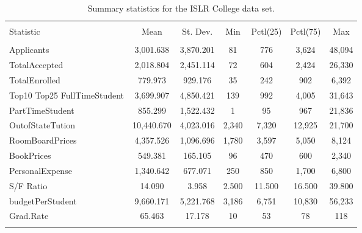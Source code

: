 \documentclass{article}\usepackage[]{graphicx}\usepackage[]{color}
\begin{document}
\begin{sidewaystable}[!htbp] \centering 
  \caption{Summary statistics for the ISLR College data set.} 
  \label{descrips} 
\begin{tabular}{@{\extracolsep{5pt}}lcccccc} 
\\[-1.8ex]\hline 
\hline \\[-1.8ex] 
Statistic & \multicolumn{1}{c}{Mean} & \multicolumn{1}{c}{St. Dev.} & \multicolumn{1}{c}{Min} & \multicolumn{1}{c}{Pctl(25)} & \multicolumn{1}{c}{Pctl(75)} & \multicolumn{1}{c}{Max} \\ 
\hline \\[-1.8ex] 
Applicants & 3,001.638 & 3,870.201 & 81 & 776 & 3,624 & 48,094 \\ 
TotalAccepted & 2,018.804 & 2,451.114 & 72 & 604 & 2,424 & 26,330 \\ 
TotalEnrolled & 779.973 & 929.176 & 35 & 242 & 902 & 6,392 \\ 
Top10%
Top25%
FullTimeStudent & 3,699.907 & 4,850.421 & 139 & 992 & 4,005 & 31,643 \\ 
PartTimeStudent & 855.299 & 1,522.432 & 1 & 95 & 967 & 21,836 \\ 
OutofStateTution & 10,440.670 & 4,023.016 & 2,340 & 7,320 & 12,925 & 21,700 \\ 
RoomBoardPrices & 4,357.526 & 1,096.696 & 1,780 & 3,597 & 5,050 & 8,124 \\ 
BookPrices & 549.381 & 165.105 & 96 & 470 & 600 & 2,340 \\ 
PersonalExpense & 1,340.642 & 677.071 & 250 & 850 & 1,700 & 6,800 \\ 
S/F Ratio & 14.090 & 3.958 & 2.500 & 11.500 & 16.500 & 39.800 \\ 
budgetPerStudent & 9,660.171 & 5,221.768 & 3,186 & 6,751 & 10,830 & 56,233 \\ 
Grad.Rate & 65.463 & 17.178 & 10 & 53 & 78 & 118 \\ 
\hline \\[-1.8ex] 
\end{tabular} 
\end{sidewaystable} 
\end{document}
